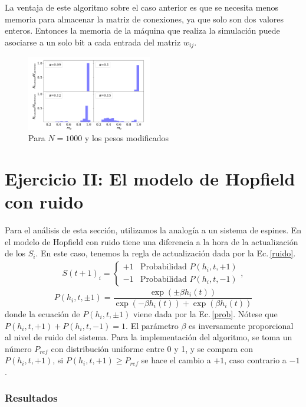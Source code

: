 La ventaja de este algoritmo sobre el caso anterior es que se necesita menos memoria para almacenar la matriz de conexiones, ya que solo son dos valores enteros. Entonces la memoria de la máquina que realiza la simulación puede asociarse a un solo bit a cada entrada del matriz $w_{ij}$\cite{hertz}.


\begin{figure}[H]
	\centering
	\includegraphics[width=0.485\textwidth]{../Graficos/1000_alpha.png}
	\caption{Para $N=1000$ y los pesos modificados}
	\label{fig:1000_alpha}
\end{figure}
\section*{Ejercicio II: El modelo de Hopfield con ruido}

Para el análisis de esta sección, utilizamos la analogía a un sistema de espines. En el modelo de Hopfield con ruido tiene una diferencia a la hora de la actualización de los $S_i$. En este caso, tenemos la regla de actualización dada por la Ec.\,\ref{ruido}.
\begin{align}
	S(t+1)_i=  \begin{cases} 
   +1 & \text{Probabilidad }P(h_i, t, +1) \\
   -1 & \text{Probabilidad }P(h_i, t, -1) 
\end{cases},
\label{ruido}
\end{align}
\begin{equation}
	P(h_i, t, \pm 1) = \frac{\exp{(\pm \beta h_i(t))}}{\exp{(- \beta h_i(t))} +\exp{(\beta h_i(t))}}
	\label{prob}
\end{equation}
donde  la ecuación de $P(h_i, t, \pm1)$ viene dada por la Ec.\,\ref{prob}. Nótese que $P(h_i, t, +1) + P(h_i, t, -1) =1$. El parámetro $\beta$ es inversamente proporcional al nivel de ruido del sistema. Para la implementación del algoritmo, se toma un número $P_{ref}$ con distribución uniforme entre 0 y 1, y se compara con $P(h_i, t, +1)$, si  $P(h_i, t, +1) \ge P_{ref}$ se hace el cambio a $+1$, caso contrario a $-1$.


\subsubsection{Resultados}

